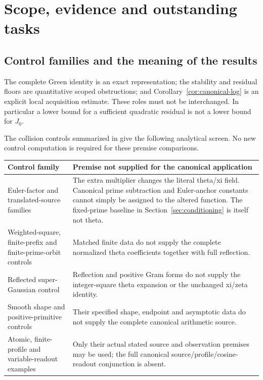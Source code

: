 \section{Scope, evidence and outstanding tasks}\label{sec:tasks}

\subsection{Control families and the meaning of the results}

The complete Green identity is an exact representation; the stability
and residual floors are quantitative scoped obstructions; and
Corollary~\ref{cor:canonical-log} is an explicit local acquisition
estimate. These roles must not be interchanged. In particular a
lower bound for a sufficient quadratic residual is not a lower
bound for \(J_0\).

The collision controls summarized in \cite{OGControls} give the
following analytical screen. No new control computation is required
for these premise comparisons.

\begin{center}\small
\begin{tabularx}{\textwidth}{@{}>{\raggedright\arraybackslash}p{}Y@{}}
\toprule
Control family & Premise not supplied for the canonical application\\
\midrule
Euler-factor and translated-source families &
The extra multiplier changes the literal theta/xi field. Canonical
prime subtraction and Euler-anchor constants cannot simply be assigned
to the altered function. The fixed-prime baseline in
Section~\ref{sec:conditioning} is itself not theta.\\
Weighted-square, finite-prefix and finite-prime-orbit controls &
Matched finite data do not supply the complete normalized theta
coefficients together with full reflection.\\
Reflected super-Gaussian control &
Reflection and positive Gram forms do not supply the integer-square
theta expansion or the unchanged xi/zeta identity.\\
Smooth shape and positive-primitive controls &
Their specified shape, endpoint and asymptotic data do not supply the
complete canonical arithmetic source.\\
Atomic, finite-profile and variable-readout examples &
Only their actual stated source and observation premises may be used;
the full canonical source/profile/cosine-readout conjunction is absent.\\
\bottomrule
\end{tabularx}
\end{center}

